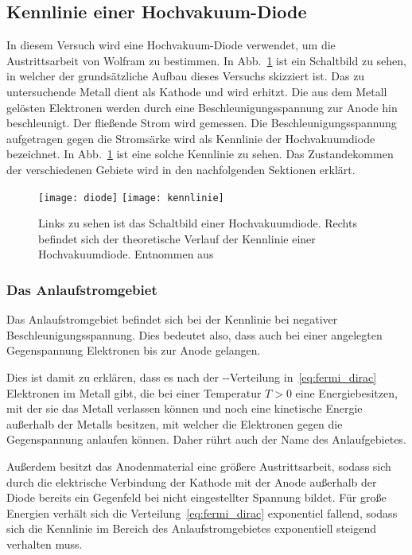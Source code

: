 \subsection{Kennlinie einer Hochvakuum-Diode}
%
In diesem Versuch wird eine Hochvakuum-Diode verwendet, um die
Austrittsarbeit von Wolfram zu bestimmen. In Abb.~\ref{fig:diode} ist
ein Schaltbild zu sehen, in welcher der grundsätzliche Aufbau dieses
Versuchs skizziert ist.  Das zu untersuchende Metall dient als Kathode
und wird erhitzt. Die aus dem Metall gelösten Elektronen werden durch
eine Beschleunigungsspannung zur Anode hin beschleunigt. Der fließende
Strom wird gemessen. Die Beschleunigungsspannung aufgetragen gegen die
Stromsärke wird als Kennlinie der Hochvakuumdiode bezeichnet.  In
Abb.~\ref{fig:diode} ist eine solche Kennlinie zu sehen.  Das
Zustandekommen der verschiedenen Gebiete wird in den nachfolgenden
Sektionen erklärt.
%
\begin{figure}[]
\centering
\texttt{[image: diode]}
\hspace{7 mm}
\texttt{[image: kennlinie]}
\caption{Links zu sehen ist das Schaltbild einer Hochvakuumdiode. Rechts
  befindet sich der theoretische Verlauf der Kennlinie einer
  Hochvakuumdiode. Entnommen aus \textcite{v504}}
\label{fig:diode}
\end{figure}
%

\subsubsection{Das Anlaufstromgebiet}
%
Das Anlaufstromgebiet befindet sich bei der Kennlinie bei negativer
Beschleunigungsspannung. Dies bedeutet also, dass auch bei einer
angelegten Gegenspannung Elektronen bis zur Anode gelangen.

Dies ist damit zu erklären, dass es nach der
--Verteilung in~\eqref{eq:fermi_dirac}
Elektronen im Metall gibt, die bei einer Temperatur $T > 0$ eine
Energiebesitzen, mit der sie das Metall verlassen können und noch eine
kinetische Energie außerhalb der Metalls besitzen, mit welcher die
Elektronen gegen die Gegenspannung anlaufen können. Daher rührt auch der
Name des Anlaufgebietes.

Außerdem besitzt das Anodenmaterial eine größere Austrittsarbeit, sodass
sich durch die elektrische Verbindung der Kathode mit der Anode
außerhalb der Diode bereits ein Gegenfeld bei nicht eingestellter
Spannung bildet. Für große Energien verhält sich die
Verteilung~\eqref{eq:fermi_dirac} exponentiel fallend, sodass sich die
Kennlinie im Bereich des Anlaufstromgebietes exponentiell steigend
verhalten muss.

